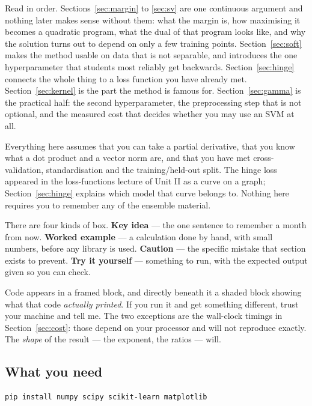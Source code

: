 \documentclass[11pt]{article}
\begin{document}
Read in order. Sections~\ref{sec:margin} to \ref{sec:sv} are one continuous
argument and nothing later makes sense without them: what the margin is, how
maximising it becomes a quadratic program, what the dual of that program looks
like, and why the solution turns out to depend on only a few training points.
Section~\ref{sec:soft} makes the method usable on data that is not separable,
and introduces the one hyperparameter that students most reliably get
backwards. Section~\ref{sec:hinge} connects the whole thing to a loss function
you have already met. Section~\ref{sec:kernel} is the part the method is famous
for. Section~\ref{sec:gamma} is the practical half: the second
hyperparameter, the preprocessing step that is not optional, and the measured
cost that decides whether you may use an SVM at all.

Everything here assumes that you can take a partial derivative, that you know
what a dot product and a vector norm are, and that you have met
cross-validation, standardisation and the training/held-out split. The hinge
loss appeared in the loss-functions lecture of Unit II as a curve on a graph;
Section~\ref{sec:hinge} explains which model that curve belongs to. Nothing
here requires you to remember any of the ensemble material.

There are four kinds of box. \textbf{Key idea} --- the one sentence to
remember a month from now. \textbf{Worked example} --- a calculation done by
hand, with small numbers, before any library is used. \textbf{Caution} --- the
specific mistake that section exists to prevent. \textbf{Try it yourself} ---
something to run, with the expected output given so you can check.

Code appears in a framed block, and directly beneath it a shaded block showing
what that code \emph{actually printed}. If you run it and get something
different, trust your machine and tell me. The two exceptions are the wall-clock
timings in Section~\ref{sec:cost}: those depend on your processor and will not
reproduce exactly. The \emph{shape} of the result --- the exponent, the ratios
--- will.

\subsection{What you need}

\begin{lstlisting}
pip install numpy scipy scikit-learn matplotlib
\end{lstlisting}
\end{document}
